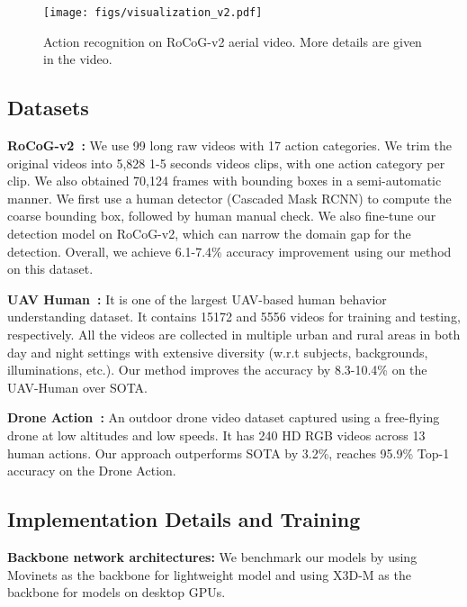 \documentclass[letterpaper, 10 pt, conference]{ieeeconf}
\begin{document}
\begin{figure}[t]
    \centering
        \texttt{[image: figs/visualization\_v2.pdf]}
        \caption{Action recognition on RoCoG-v2 aerial video.  More details are given in the video.}
        \vspace{-10pt}
    \label{fig: visual}
\end{figure}

\subsection{Datasets}

\noindent  \textbf{RoCoG-v2~\cite{de2022icras,de2020vision}:} We use 99 long raw videos with 17 action categories. We trim the original videos into 5,828 1-5 seconds videos clips, with one action category per clip. We also obtained 70,124 frames with bounding boxes in a semi-automatic manner. We first use a human detector (Cascaded Mask RCNN) to compute the coarse bounding box, followed by human manual check. We also fine-tune our detection model on RoCoG-v2, which can narrow the domain gap for the detection. Overall, we achieve 6.1-7.4\% accuracy improvement using our method on this dataset.

\noindent  \textbf{UAV Human~\cite{li2021uav}:} It is one of the largest UAV-based human behavior understanding dataset. It contains 15172 and 5556 videos for training and testing, respectively. All the videos are collected in multiple urban and rural areas in both day and night  settings with extensive diversity (w.r.t subjects, backgrounds, illuminations, etc.). Our method improves the accuracy by 8.3-10.4\% on the UAV-Human over SOTA.

\noindent  \textbf{Drone Action~\cite{perera2019drone}:} An outdoor drone video dataset captured using a free-flying drone at low altitudes and low speeds. It has 240 HD RGB videos across 13 human actions. Our approach outperforms SOTA by 3.2\%, reaches 95.9\% Top-1 accuracy on the Drone Action.

\subsection{Implementation Details and Training}
\noindent \textbf{Backbone network architectures:} We benchmark our models by using Movinets\cite{kondratyuk2021movinets} as the backbone for lightweight model and using X3D-M \cite{feichtenhofer2020x3d} as the backbone for models on desktop GPUs.
\end{document}
